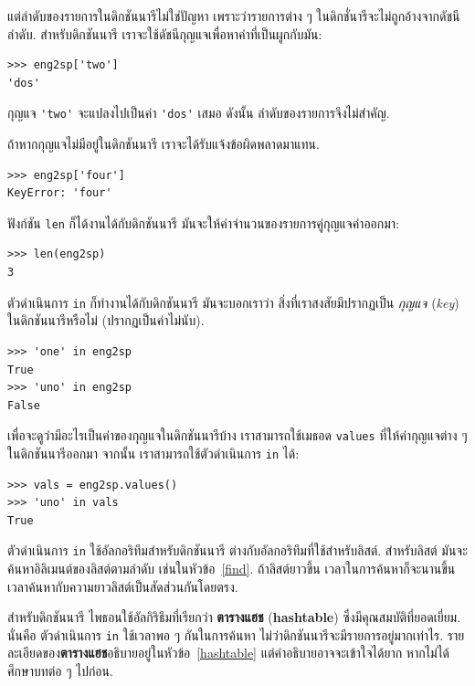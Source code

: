 แต่ลำดับของรายการในดิกชันนารีไม่ใช่ปัญหา 
เพราะว่ารายการต่าง ๆ ในดิกชั่นารีจะไม่ถูกอ้างจากดัชนีลำดับ.
สำหรับดิกชันนารี เราจะใช้ดัชนีกุญแจเพื่อหาค่าที่เป็นผูกกับมัน:

\begin{verbatim}
>>> eng2sp['two']
'dos'
\end{verbatim}
%
กุญแจ \verb|'two'| จะแปลงไปเป็นค่า \verb|'dos'| เสมอ
ดังนั้น ลำดับของรายการจึงไม่สำคัญ.

ถ้าหากกุญแจไม่มีอยู่ในดิกชันนารี เราจะได้รับแจ้งข้อผิดพลาดมาแทน.

\begin{verbatim}
>>> eng2sp['four']
KeyError: 'four'
\end{verbatim}
%
ฟังก์ชัน \texttt{len} ก็ได้งานได้กับดิกชันนารี
มันจะให้ค่าจำนวนของรายการคู่กุญแจค่าออกมา:

\begin{verbatim}
>>> len(eng2sp)
3
\end{verbatim}
%
ตัวดำเนินการ \texttt{in} ก็ทำงานได้กับดิกชันนารี
มันจะบอกเราว่า สิ่งที่เราสงสัยมีปรากฏเป็น \emph{กุญแจ} (\emph{key}) ในดิกชันนารีหรือไม่ (ปรากฏเป็นค่าไม่นับ).

\begin{verbatim}
>>> 'one' in eng2sp
True
>>> 'uno' in eng2sp
False
\end{verbatim}
%
เพื่อจะดูว่ามีอะไรเป็นค่าของกุญแจในดิกชันนารีบ้าง
เราสามารถใช้เมธอด \texttt{values} ที่ให้ค่ากุญแจต่าง ๆ ในดิกชันนารีออกมา
จากนั้น เราสามารถใช้ตัวดำเนินการ \texttt{in} ได้:

\begin{verbatim}
>>> vals = eng2sp.values()
>>> 'uno' in vals
True
\end{verbatim}
%
ตัวดำเนินการ \texttt{in} ใช้อัลกอริทึมสำหรับดิกชันนารี ต่างกับอัลกอริทึมที่ใช้สำหรับลิสต์.
สำหรับลิสต์ มันจะค้นหาอิลิเมนต์ของลิสต์ตามลำดับ เช่นในหัวข้อ~\ref{find}.
ถ้าลิสต์ยาวขึ้น เวลาในการค้นหาก็จะนานขึ้น เวลาค้นหากับความยาวลิสต์เป็นสัดส่วนกันโดยตรง.

สำหรับดิกชันนารี ไพธอนใช้อัลกิริธึมที่เรียกว่า \textbf{ตารางแฮช} (\textbf{hashtable}) ซึ่งมีคุณสมบัติที่ยอดเยี่ยม.
นั่นคือ 
ตัวดำเนินการ \texttt{in} ใช้เวลาพอ ๆ กันในการค้นหา ไม่ว่าดิกชันนารีจะมีรายการอยู่มากเท่าไร.
รายละเอียดของ\textbf{ตารางแฮช}อธิบายอยู่ในหัวข้อ~\ref{hashtable}
แต่คำอธิบายอาจจะเข้าใจได้ยาก หากไม่ได้ศึกษาบทต่อ ๆ ไปก่อน.


